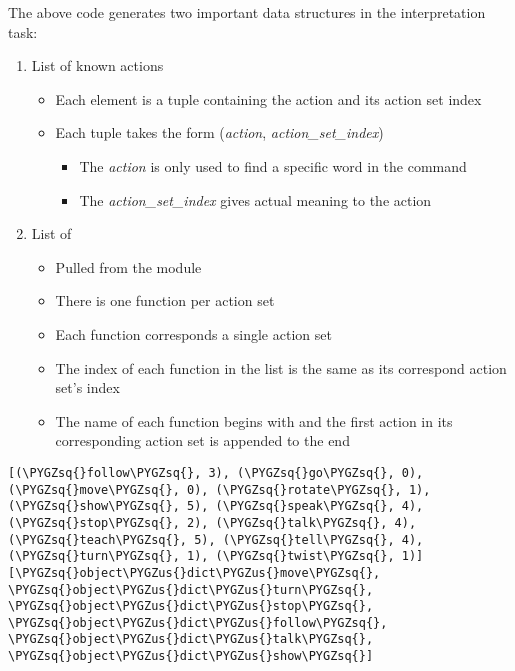 \documentclass[letterpaper,10pt,english]{sphinxmanual}
\def\PYGZus{\char`\_}
\def\PYGZsq{\char`\'}
\renewcommand\PYGZsq{\textquotesingle}
\begin{document}
The above code generates two important data structures in the interpretation task:
\begin{enumerate}
\item {} 
List of known actions
\begin{itemize}
\item {} 
Each element is a tuple containing the action and its action set index

\item {} 
Each tuple takes the form (\emph{action}, \emph{action\_set\_index})
\begin{itemize}
\item {} 
The \emph{action} is only used to find a specific word in the command

\item {} 
The \emph{action\_set\_index} gives actual meaning to the action

\end{itemize}

\end{itemize}

\item {} 
List of {\hyperref[terms:object-extractor-function]{\emph{}}}
\begin{itemize}
\item {} 
Pulled from the {\hyperref[extractor:module-interpreter.extractor]{\emph{}}} module

\item {} 
There is one function per action set

\item {} 
Each function corresponds a single action set

\item {} 
The index of each function in the list is the same as its correspond action set's index

\item {} 
The name of each function begins with  and the first action in its corresponding action set is appended to the end

\end{itemize}

\end{enumerate}

\begin{Verbatim}[commandchars=\\\{\}]
[(\PYGZsq{}follow\PYGZsq{}, 3), (\PYGZsq{}go\PYGZsq{}, 0), (\PYGZsq{}move\PYGZsq{}, 0), (\PYGZsq{}rotate\PYGZsq{}, 1), (\PYGZsq{}show\PYGZsq{}, 5), (\PYGZsq{}speak\PYGZsq{}, 4), (\PYGZsq{}stop\PYGZsq{}, 2), (\PYGZsq{}talk\PYGZsq{}, 4), (\PYGZsq{}teach\PYGZsq{}, 5), (\PYGZsq{}tell\PYGZsq{}, 4), (\PYGZsq{}turn\PYGZsq{}, 1), (\PYGZsq{}twist\PYGZsq{}, 1)]
[\PYGZsq{}object\PYGZus{}dict\PYGZus{}move\PYGZsq{}, \PYGZsq{}object\PYGZus{}dict\PYGZus{}turn\PYGZsq{}, \PYGZsq{}object\PYGZus{}dict\PYGZus{}stop\PYGZsq{}, \PYGZsq{}object\PYGZus{}dict\PYGZus{}follow\PYGZsq{}, \PYGZsq{}object\PYGZus{}dict\PYGZus{}talk\PYGZsq{}, \PYGZsq{}object\PYGZus{}dict\PYGZus{}show\PYGZsq{}]
\end{Verbatim}
\end{document}
